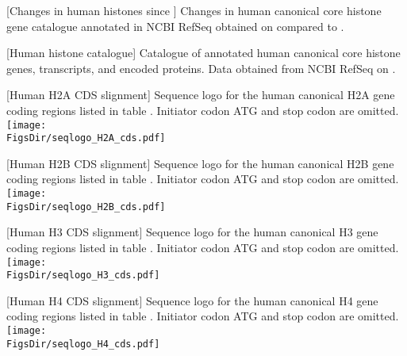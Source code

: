   \begin{center}
    [Changes in human histones since \citet{Marzluff02}]{%
        Changes in human canonical core histone gene catalogue
        annotated in NCBI RefSeq obtained on \SequencesDate{}
        compared to \citet{Marzluff02}.
    }
    \label{tab:difference-from-Marzluff02}
    
  \end{center}

  \newpage
  [Human histone catalogue]{%
    Catalogue of annotated human canonical core histone genes, transcripts,
    and encoded proteins.
    Data obtained from NCBI RefSeq \citep{OLearyRefseq2016} on \SequencesDate{}.
  }
  \label{tab:histone-catalogue}
  

  \newpage
  \begin{center}
    [Human H2A CDS slignment]{
        Sequence logo for the human canonical H2A gene coding regions
        listed in table .
        Initiator codon ATG and stop codon are omitted.
    }
    \label{fig:h2a-histone-gene-variation}
    \texttt{[image: \\FigsDir/seqlogo\_H2A\_cds.pdf]}
  \end{center}
  \newpage
  \begin{center}
    [Human H2B CDS slignment]{
        Sequence logo for the human canonical H2B gene coding regions
        listed in table .
        Initiator codon ATG and stop codon are omitted.
    }
    \label{fig:h2b-histone-gene-variation}
    \texttt{[image: \\FigsDir/seqlogo\_H2B\_cds.pdf]}
  \end{center}
  \newpage
  \begin{center}
    [Human H3 CDS slignment]{
        Sequence logo for the human canonical H3 gene coding regions
        listed in table .
        Initiator codon ATG and stop codon are omitted.
    }
    \label{fig:h3-histone-gene-variation}
    \texttt{[image: \\FigsDir/seqlogo\_H3\_cds.pdf]}
  \end{center}
  \newpage
  \begin{center}
    [Human H4 CDS slignment]{
        Sequence logo for the human canonical H4 gene coding regions
        listed in table .
        Initiator codon ATG and stop codon are omitted.
    }
    \label{fig:h4-histone-gene-variation}
    \texttt{[image: \\FigsDir/seqlogo\_H4\_cds.pdf]}
  \end{center}

